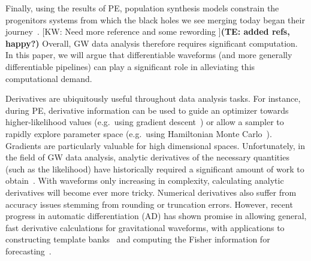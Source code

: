 \documentclass[twocolumn]{aastex631}
\newcommand{\te}[1]{\textbf{\color{pyGreen}(TE: #1)}}
\newcommand{\kw}[1]{{\color{rb4}[KW: #1 ]}}
\newcommand{\AZ}[1]{{\color{Burnt}[AZ: #1]}}
\newcommand{\dfm}[1]{{\color{dfm}[DFM: #1]}}
\begin{document}
Finally, using the results of PE, population synthesis models constrain the progenitors systems from which the black holes we see merging today began their journey~\citep{LIGOScientific:2020kqk, LIGOScientific:2021psn, Wong:2022flg}.
\kw{Need more reference and some rewording}\te{added refs, happy?}
Overall, GW data analysis therefore requires significant computation.
In this paper, we will argue that differentiable waveforms (and more generally differentiable pipelines) can play a significant role in alleviating this computational demand.

Derivatives are ubiquitously useful throughout data analysis tasks.
For instance, during PE, derivative information can be used to guide an optimizer towards higher-likelihood values (e.g.\ using gradient descent~\citep{2016arXiv160904747R}) or allow a sampler to rapidly explore parameter space (e.g.\ using Hamiltonian Monte Carlo~\citep{2011hmcm.book..113N,2017arXiv170102434B}).
Gradients are particularly valuable for high dimensional spaces.
Unfortunately, in the field of GW data analysis, analytic derivatives of the necessary quantities (such as the likelihood) have historically required a significant amount of work to obtain~\citep{Keppel:2013kia}.
With waveforms only increasing in complexity, calculating analytic derivatives will become ever more tricky.
Numerical derivatives also suffer from accuracy issues stemming from rounding or truncation errors.
However, recent progress in automatic differentiation (AD) has shown promise in allowing general, fast derivative calculations for gravitational waveforms, with applications to constructing template banks~\citep{Coogan:2022qxs} and computing the Fisher information for forecasting~\citep{Iacovelli:2022bbs, Iacovelli:2022mbg}.
\end{document}
